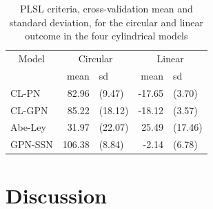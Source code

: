 \documentclass[12pt,]{article}
\begin{document}
\begin{table}

\caption{\label{tab:ModelFit}PLSL criteria, cross-validation mean and standard deviation, for the circular and linear outcome in the four cylindrical models}
\centering
\begin{tabular}[t]{lrlrl}
\toprule
\multicolumn{1}{c}{Model} & \multicolumn{2}{c}{Circular} & \multicolumn{2}{c}{Linear} \\
\cmidrule(l{2pt}r{2pt}){1-1} \cmidrule(l{2pt}r{2pt}){2-3} \cmidrule(l{2pt}r{2pt}){4-5}
  & mean & sd & mean & sd\\
\midrule
CL-PN & 82.96 & (9.47) & -17.65 & (3.70)\\
CL-GPN & 85.22 & (18.12) & -18.12 & (3.57)\\
Abe-Ley & 31.97 & (22.07) & 25.49 & (17.46)\\
GPN-SSN & 106.38 & (8.84) & -2.14 & (6.78)\\
\bottomrule
\end{tabular}
\end{table}

\section{Discussion}\label{Discussion}
\end{document}
